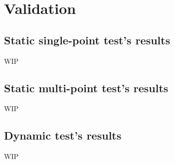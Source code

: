 
\chapter{Validation}
\label{cap:val}

\section{Static single-point test's results}

WIP

\section{Static multi-point test's results}

WIP

\section{Dynamic test's results}

WIP
